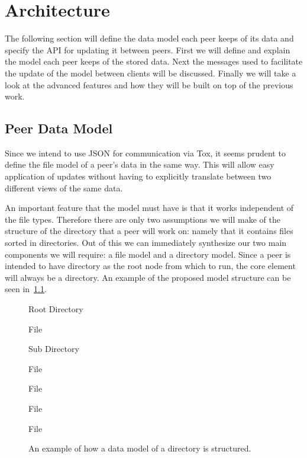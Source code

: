 \chapter{Architecture}
\label{chap:architecture}

The following section will define the data model each peer keeps of its data and specify the API for updating it between peers.
First we will define and explain the model each peer keeps of the stored data.
Next the messages used to facilitate the update of the model between clients will be discussed.
Finally we will take a look at the advanced features and how they will be built on top of the previous work.

\section{Peer Data Model}


Since we intend to use JSON for communication via Tox, it seems prudent to define the file model of a peer's data in the same way.
This will allow easy application of updates without having to explicitly translate between two different views of the same data.

An important feature that the model must have is that it works independent of the file types.
Therefore there are only two assumptions we will make of the structure of the directory that a peer will work on: namely that it contains files sorted in directories.
Out of this we can immediately synthesize our two main components we will require: a file model and a directory model.
Since a peer is intended to have directory as the root node from which to run, the core element will always be a directory.
An example of the proposed model structure can be seen in~\ref{list:model}.

\begin{figure}[htp]
\begin{modellist}
\item Root Directory
    \begin{modellist}
        \item File
        \item Sub Directory
            \begin{modellist}
                \item File
                \item File
            \end{modellist}
        \item File
        \item File
    \end{modellist}
\end{modellist}
\caption[Data Model Example Structure]{An example of how a data model of a directory is structured.}
\label{list:model}
\end{figure}

